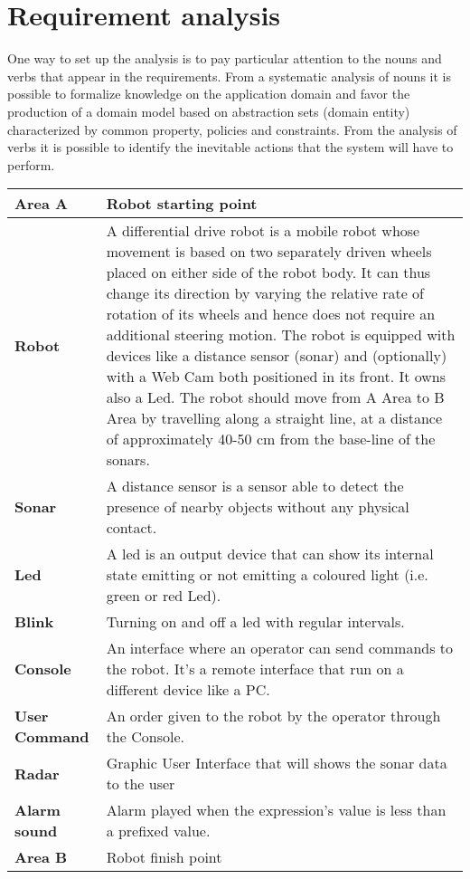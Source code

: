 \section{Requirement analysis}
One way to set up the analysis is to pay particular attention to the nouns and verbs that appear in the requirements. From a systematic analysis of nouns it is possible to formalize knowledge on the application domain and favor the production of a domain model based on abstraction sets (domain entity) characterized by common property, policies and constraints. From the analysis of verbs it is possible to identify the inevitable actions that the system will have to perform.
\begin{minipage}{\linewidth}
\centering
{} \label{tab:title} 
\end{minipage}
\begin{tabular}{| l | p{10cm} |}
\hline
\textbf{Area A} & Robot starting point \\ \hline
\textbf{Robot} & A differential drive robot is a mobile robot whose movement is based on two separately driven wheels placed on either side of the robot body. It can thus change its direction by varying the relative rate of rotation of its wheels and hence does not require an additional steering motion. The robot is equipped with devices like a distance sensor (sonar) and (optionally) with a Web Cam both positioned in its front. It owns also a Led. The robot should move from A Area to B Area by travelling along a straight line, at a distance of approximately 40-50 cm from the base-line of the sonars. \\ \hline
\textbf{Sonar} & A distance sensor is a sensor able to detect the presence of nearby objects without any physical contact. \\ \hline
\textbf{Led} & A led is an output device that can show its internal state emitting or not emitting a coloured light (i.e. green or red Led). \\ \hline
\textbf{Blink} & Turning on and off a led with regular intervals. \\ \hline
\textbf{Console} & An interface where an operator can send commands to the robot. It's a remote interface that run on a different device like a PC.\\ \hline
\textbf{User Command} & An order given to the robot by the operator through the Console. \\ \hline
\textbf{Radar} & Graphic User Interface that will shows the sonar data to the user \\ \hline
\textbf{Alarm sound} & Alarm played when the expression's value is less than a prefixed value.\\ \hline
\textbf{Area B} & Robot finish point \\ \hline
\end{tabular}



